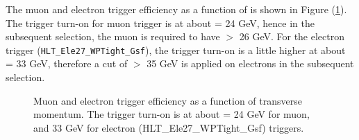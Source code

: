The muon and electron trigger efficiency as a function of \pt is shown in Figure
(\ref{fig:trigEff}). The trigger turn-on for muon trigger is at about \pt = 24 GeV,
hence in the
subsequent selection, the muon is required to have \pt $>$ 26 GeV. For the electron
trigger (\verb|HLT_Ele27_WPTight_Gsf|), the trigger turn-on is a little higher at about
\pt = 33 GeV, therefore a cut of \pt $>$ 35 GeV is applied on electrons in the
subsequent selection.
\begin{figure}
     \centering
     	\vfil
	\caption{Muon and electron trigger efficiency as a function of transverse
	momentum. The trigger turn-on is at about \pt = 24 GeV for muon, and 33 GeV
	for electron (HLT\_Ele27\_WPTight\_Gsf) triggers.}
     \label{fig:trigEff}
 \end{figure}
